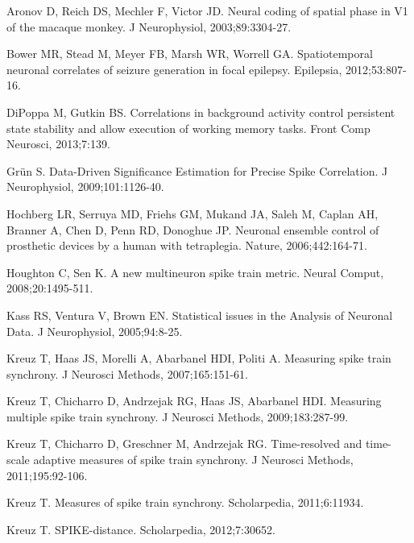\documentclass[10pt,twocolumn]{elsart5p}
\begin{document}
\begin{thebibliography}{25}

Aronov D, Reich DS, Mechler F, Victor JD. Neural coding of spatial phase in V1 of the macaque monkey. J Neurophysiol, 2003;89:3304-27.

Bower MR, Stead M, Meyer FB, Marsh WR, Worrell GA. Spatiotemporal neuronal correlates of seizure generation in focal epilepsy. Epilepsia, 2012;53:807-16.

{DiPoppa} M, Gutkin BS. Correlations in background activity control persistent state stability and allow execution of working memory tasks. Front Comp Neurosci, 2013;7:139.

Gr{\"u}n S. Data-Driven Significance Estimation for Precise Spike Correlation. J Neurophysiol, 2009;101:1126-40.

Hochberg LR, Serruya MD, Friehs GM, Mukand JA, Saleh M, Caplan AH, Branner A, Chen D, Penn RD, Donoghue JP. Neuronal ensemble control of prosthetic devices by a human with tetraplegia. Nature, 2006;442:164-71.

Houghton C, Sen K. A new multineuron spike train metric. Neural Comput, 2008;20:1495-511.

Kass RS, Ventura V, Brown EN. Statistical issues in the Analysis of Neuronal Data. J Neurophysiol, 2005;94:8-25.

Kreuz T, Haas JS, Morelli A, Abarbanel HDI, Politi A. Measuring spike train synchrony. J Neurosci Methods, 2007;165:151-61.

Kreuz T, Chicharro D, Andrzejak RG, Haas JS, Abarbanel HDI. Measuring multiple spike train synchrony. J Neurosci Methods, 2009;183:287-99.

Kreuz T, Chicharro D, Greschner M, Andrzejak RG. Time-resolved and time-scale adaptive measures of spike train synchrony. J Neurosci Methods, 2011;195:92-106.

Kreuz T. Measures of spike train synchrony. Scholarpedia, 2011;6:11934.

Kreuz T. SPIKE-distance. Scholarpedia, 2012;7:30652.


\end{thebibliography}
\end{document}
